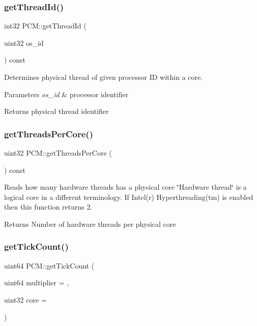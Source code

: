 \subsubsection{\texorpdfstring{get\+Thread\+Id()}{getThreadId()}}
{\footnotesize\ttfamily int32 P\+C\+M\+::get\+Thread\+Id (\begin{DoxyParamCaption}\item[{uint32}]{os\+\_\+id }\end{DoxyParamCaption}) const\hspace{0.3cm}{\ttfamily [inline]}}



Determines physical thread of given processor ID within a core. 


\begin{DoxyParams}{Parameters}
{\em os\+\_\+id} & processor identifier \\
\hline
\end{DoxyParams}
\begin{DoxyReturn}{Returns}
physical thread identifier 
\end{DoxyReturn}
\mbox{\label{class_p_c_m_a850a9aeee162133adbc4b5d8df679639}} 
\subsubsection{\texorpdfstring{get\+Threads\+Per\+Core()}{getThreadsPerCore()}}
{\footnotesize\ttfamily uint32 P\+C\+M\+::get\+Threads\+Per\+Core (\begin{DoxyParamCaption}{ }\end{DoxyParamCaption}) const}



Reads how many hardware threads has a physical core \char`\"{}\+Hardware thread\char`\"{} is a logical core in a different terminology. If Intel(r) Hyperthreading(tm) is enabled then this function returns 2. 

\begin{DoxyReturn}{Returns}
Number of hardware threads per physical core 
\end{DoxyReturn}
\mbox{\label{class_p_c_m_a794f5852662a2827b34eb16025564c70}} 
\subsubsection{\texorpdfstring{get\+Tick\+Count()}{getTickCount()}}
{\footnotesize\ttfamily uint64 P\+C\+M\+::get\+Tick\+Count (\begin{DoxyParamCaption}\item[{uint64}]{multiplier = {},  }\item[{uint32}]{core = {} }\end{DoxyParamCaption})}




